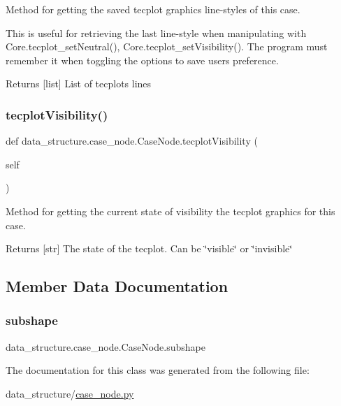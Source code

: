 Method for getting the saved tecplot graphics line-\/styles of this case. 

This is useful for retrieving the last line-\/style when manipulating with Core.\+tecplot\+\_\+set\+Neutral(), Core.\+tecplot\+\_\+set\+Visibility(). The program must remember it when toggling the options to save user\textquotesingle{}s preference.

\begin{DoxyReturn}{Returns}
\mbox{[}list\mbox{]} List of tecplots lines 
\end{DoxyReturn}
\hypertarget{a00086_aeb90281663e7094357befb23383a0d12}{}\label{a00086_aeb90281663e7094357befb23383a0d12} 
\subsubsection{\texorpdfstring{tecplot\+Visibility()}{tecplotVisibility()}}
{\footnotesize\ttfamily def data\+\_\+structure.\+case\+\_\+node.\+Case\+Node.\+tecplot\+Visibility (\begin{DoxyParamCaption}\item[{}]{self }\end{DoxyParamCaption})}



Method for getting the current state of visibility the tecplot graphics for this case. 

\begin{DoxyReturn}{Returns}
\mbox{[}str\mbox{]} The state of the tecplot. Can be \char`\"{}visible\char`\"{} or \char`\"{}invisible\char`\"{} 
\end{DoxyReturn}


\subsection{Member Data Documentation}
\hypertarget{a00086_ac2f5b0ae9715edeac8f9b1ccc0fd64e3}{}\label{a00086_ac2f5b0ae9715edeac8f9b1ccc0fd64e3} 
\subsubsection{\texorpdfstring{subshape}{subshape}}
{\footnotesize\ttfamily data\+\_\+structure.\+case\+\_\+node.\+Case\+Node.\+subshape}



The documentation for this class was generated from the following file\+:\begin{DoxyCompactItemize}
\item 
data\+\_\+structure/\hyperlink{a00017}{case\+\_\+node.\+py}\end{DoxyCompactItemize}
